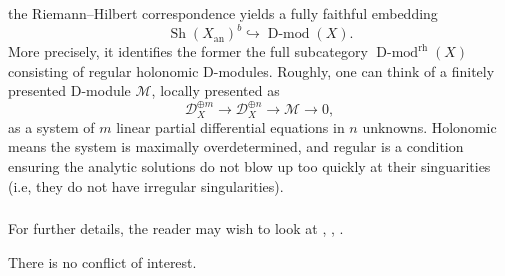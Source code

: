 \documentclass[10pt]{amsart}
\newcommand{\sM}{\mathscr{M}}
\newcommand{\on}{\operatorname}
\theoremstyle{remark}
\newcommand{\sS}{\mathscr{S}}
\newcommand{\OO}{\mathscr{O}}
\newcommand{\sD}{\mathscr{D}}
\numberwithin{equation}{section}
\newcommand{\sO}{\mathscr{O}}
\begin{document}
	the Riemann--Hilbert correspondence yields a fully faithful embedding 
	\[
	\on{Sh}(X_{\on{an}})^b \hookrightarrow \on{D-mod}(X). 
	\]
	More precisely, it identifies the former the full subcategory 
	$\on{D-mod}^{\on{rh}}(X)$ consisting of regular holonomic D-modules. 
	Roughly, one can think of a finitely presented D-module $\sM$, locally 
	presented as 
	\[
	\sD_X^{\oplus m} \rightarrow \sD_X^{\oplus n} \rightarrow \sM \rightarrow 0,
	\]
	as a system of $m$ linear partial differential equations in $n$ unknowns. 
	Holonomic means the system is maximally overdetermined, 
	and regular is a condition ensuring the analytic solutions do not blow up 
	too quickly at their singuarities (i.e, they do not have irregular 
	singularities). 
	
	
	
	
	
	
	\fi
	
	
	
	
	
	
	
	
	
	
	
	
	

	
	
	
	\subsubsection{} For further details, the reader may wish to look at \cite{arkhipovnotes}, \cite{bernsteinnotes}, \cite{hottatakeuchitanisaki}.
	
	
	
	
	
	
		\vspace{.5cm}
	
	 There is no conflict of interest. 
	
	
	
	
	
\end{document}
